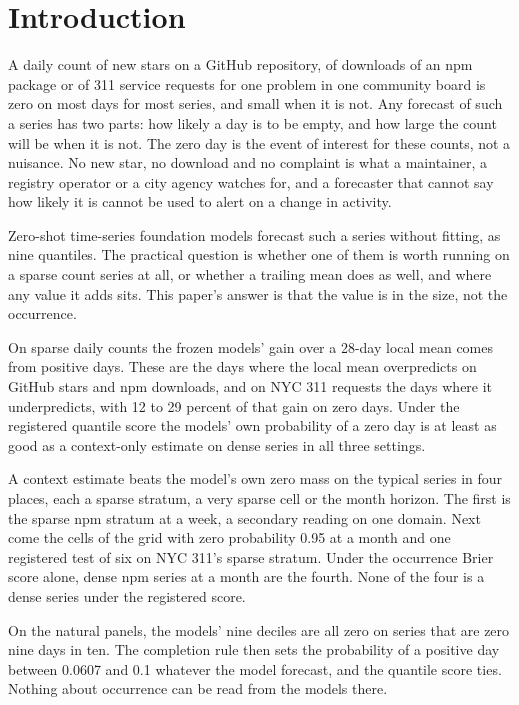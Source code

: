 \providecommand{\lm}{\texttt{local\_mean\_28}}
\providecommand{\qs}{QScore9}

\section{Introduction}

A daily count of new stars on a GitHub repository, of downloads of an npm package or of 311 service requests
for one problem in one community board is zero on most days for most series, and small when it is not. Any
forecast of such a series has two parts: how likely a day is to be empty, and how large the count will be when
it is not. The zero day is the event of interest for these counts, not a nuisance. No new star, no download
and no complaint is what a maintainer, a registry operator or a city agency watches for, and a forecaster that
cannot say how likely it is cannot be used to alert on a change in activity.

Zero-shot time-series foundation models forecast such a series without fitting, as nine quantiles. The
practical question is whether one of them is worth running on a sparse count series at all, or whether a
trailing mean does as well, and where any value it adds sits. This paper's answer is that the value is in the
size, not the occurrence.

On sparse daily counts the frozen models' gain over a 28-day local mean comes from positive days. These are
the days where the local mean overpredicts on GitHub stars and npm downloads, and on NYC 311 requests the days
where it underpredicts, with 12 to 29 percent of that gain on zero days. Under the registered quantile score
the models' own probability of a zero day is at least as good as a context-only estimate on dense series in
all three settings.

A context estimate beats the model's own zero mass on the typical series in four places, each a sparse
stratum, a very sparse cell or the month horizon. The first is the sparse npm stratum at a week, a secondary
reading on one domain. Next come the cells of the grid with zero probability 0.95 at a month and one
registered test of six on NYC 311's sparse stratum. Under the occurrence Brier score alone, dense npm series
at a month are the fourth. None of the four is a dense series under the registered score.

On the natural panels, the models' nine deciles are all zero on series that are zero nine days in ten. The
completion rule then sets the probability of a positive day between 0.0607 and 0.1 whatever the model
forecast, and the quantile score ties. Nothing about occurrence can be read from the models there.

